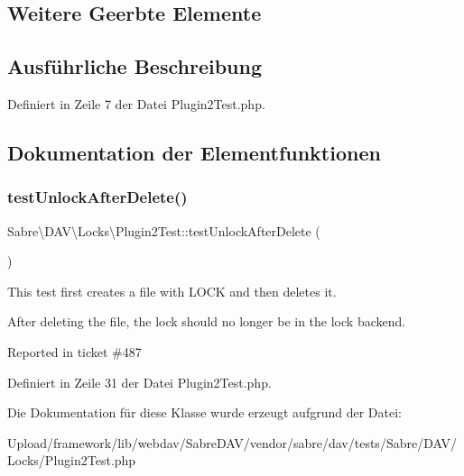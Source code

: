 \subsection*{Weitere Geerbte Elemente}


\subsection{Ausführliche Beschreibung}


Definiert in Zeile 7 der Datei Plugin2\+Test.\+php.



\subsection{Dokumentation der Elementfunktionen}
\mbox{\label{class_sabre_1_1_d_a_v_1_1_locks_1_1_plugin2_test_a513abb3279461b360cd187eb63211779}} 
\subsubsection{\texorpdfstring{test\+Unlock\+After\+Delete()}{testUnlockAfterDelete()}}
{\footnotesize\ttfamily Sabre\textbackslash{}\+D\+A\+V\textbackslash{}\+Locks\textbackslash{}\+Plugin2\+Test\+::test\+Unlock\+After\+Delete (\begin{DoxyParamCaption}{ }\end{DoxyParamCaption})}

This test first creates a file with L\+O\+CK and then deletes it.

After deleting the file, the lock should no longer be in the lock backend.

Reported in ticket \#487 

Definiert in Zeile 31 der Datei Plugin2\+Test.\+php.



Die Dokumentation für diese Klasse wurde erzeugt aufgrund der Datei\+:\begin{DoxyCompactItemize}
\item 
Upload/framework/lib/webdav/\+Sabre\+D\+A\+V/vendor/sabre/dav/tests/\+Sabre/\+D\+A\+V/\+Locks/Plugin2\+Test.\+php\end{DoxyCompactItemize}
